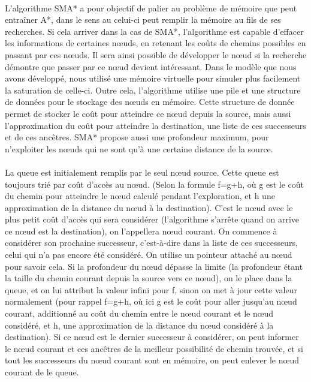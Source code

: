 \documentclass[pidr]{tnreport}
\begin{document}
\paragraph{}	
L'algorithme SMA* a pour objectif de palier au problème de mémoire que peut entraîner A*, dans le sens au celui-ci peut remplir la mémoire au fils de ses recherches. Si cela arriver dans la cas de SMA*, l'algorithme est capable d'effacer les informations de certaines nœuds, en retenant les coûts de chemins possibles en passant par ces nœuds. Il sera ainsi possible de développer le nœud si la recherche démontre que passer par ce nœud devient intéressant. Dans le modèle que nous avons développé, nous utilisé une mémoire virtuelle pour simuler plus facilement la saturation de celle-ci. Outre cela, l'algorithme utilise une pile et une structure de données pour le stockage des nœuds en mémoire. Cette structure de donnée permet de stocker le coût pour atteindre ce nœud depuis la source, mais aussi l'approximation du coût pour atteindre la destination, une liste de ces successeurs et de ces ancêtres. SMA* propose aussi une profondeur maximum, pour n'exploiter les nœuds qui ne sont qu'à une certaine distance de la source.

\paragraph{}				
La queue est initialement remplis par le seul nœud source. Cette queue est toujours trié par coût d'accès au nœud. (Selon la formule f=g+h, où g est le coût du chemin pour atteindre le nœud calculé pendant l'exploration, et h une approximation de la distance du nœud à la destination). C'est le nœud avec le plus petit coût d'accès qui sera considérer (l'algorithme s'arrête quand on arrive ce nœud est la destination), on l'appellera nœud courant. On commence à considérer son prochaine successeur, c'est-à-dire dans la liste de ces successeurs, celui qui n'a pas encore été considéré. On utilise un pointeur attaché au nœud pour savoir cela. Si la profondeur du nœud dépasse la limite (la profondeur étant la taille du chemin courant depuis la source vers ce nœud), on le place dans la queue, et on lui attribut la valeur infini pour f, sinon on met à jour cette valeur normalement (pour rappel f=g+h, où ici g est le coût pour aller jusqu'au nœud courant, additionné au coût du chemin entre le nœud courant et le nœud considéré, et h, une approximation de la distance du nœud considéré à la destination). Si ce nœud est le dernier successeur à considérer, on peut informer le nœud courant et ces ancêtres de la meilleur possibilité de chemin trouvée, et si tout les successeurs du nœud courant sont en mémoire, on peut enlever le nœud courant de le queue. 
		
\end{document}
